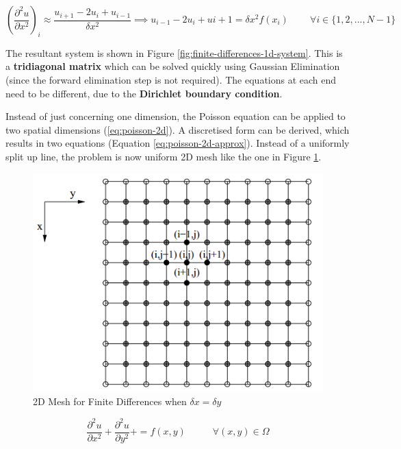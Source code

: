 \documentclass{article}
\begin{document}
\begin{equation}
	{\left( \frac{\partial^2 u}{\partial x^2}\right)}_i \approx \frac{u_{i+1} - 2u_i + u_{i - 1}}{\delta x^2} 
	\implies
	u_{i - 1} - 2u_i + u{i + 1} = \delta x^2 f(x_i)
	\;\;\;\;\;\;\;\; \forall 
	i \in \lbrace 1, 2, ..., N - 1 \rbrace
	\label{eq:finite-differences-1d-node}
\end{equation}

The resultant system is shown in Figure \ref{fig:finite-differences-1d-system}. This is a \textbf{tridiagonal matrix} which can be solved quickly using Gaussian Elimination (since the forward elimination step is not required). The equations at each end need to be different, due to the \textbf{Dirichlet boundary condition}.

Instead of just concerning one dimension, the Poisson equation can be applied to two spatial dimensions (\ref{eq:poisson-2d}). A discretised form can be derived, which results in two equations (Equation \ref{eq:poisson-2d-approx}). Instead of a uniformly split up line, the problem is now uniform 2D mesh like the one in Figure \ref{fig:2d-finite-differences-mesh}.

\begin{figure}
	\centering
	\includegraphics[scale=0.35]{figures/2d-finite-differences-mesh.png}
	\caption{2D Mesh for Finite Differences when $\delta x = \delta y$}
	\label{fig:2d-finite-differences-mesh}
\end{figure}

\begin{equation}
	\frac{\partial^2 u}{\partial x^2} + \frac{\partial^2 u}{\partial y^2} +  = f(x, y)
	\;\;\;\;\;\;\;\;\;\; \forall (x, y) \in \Omega
	\label{eq:poisson-2d}
\end{equation}
\end{document}
